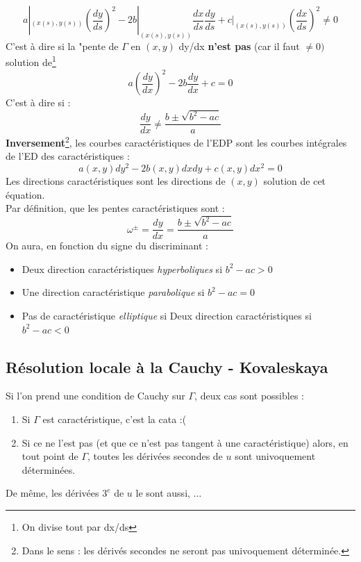 \documentclass[11pt, a4paper, openany]{book}
\begin{document}
			\begin{equation}
				a|_{(x(s),y(s))} \left(\dfrac{dy}{ds}\right)^2 - 2b|_{(x(s),y(s))} \dfrac{dx}{ds}\dfrac{dy}{ds} + c|_{(x(s),y(s))}\left(\dfrac{dx}{ds}\right)^2 \neq 0
			\end{equation}
			C'est à dire si la "pente de $\Gamma$ en $(x,y)$ dy/dx \textbf{n'est pas} (car il faut $\neq 0)$ solution de\footnote{On divise tout par dx/ds}
			\begin{equation}
				a\left(\dfrac{dy}{dx}\right)^2 - 2b\dfrac{dy}{dx} + c = 0
			\end{equation}
			C'est à dire si :
			\begin{equation}
				\dfrac{dy}{dx} \neq \dfrac{b\pm \sqrt{b^2-ac}}{a}
			\end{equation}
			\textbf{Inversement}\footnote{Dans le sens : les dérivés secondes ne seront pas univoquement déterminée.}, les courbes caractéristiques de l'EDP sont les courbes intégrales de l'ED des caractéristiques :
			\begin{equation}
				a(x,y)dy^2 - 2b(x,y)dxdy + c(x,y)dx^2 = 0
			\end{equation}
			Les directions caractéristiques sont les directions de $(x,y)$ solution de cet équation.\\Par définition, que les pentes caractéristiques sont :
			\begin{equation}
				\omega^\pm = \dfrac{dy}{dx} = \dfrac{b\pm \sqrt{b^2-ac}}{a}
			\end{equation}
			On aura, en fonction du signe du discriminant :
			\begin{itemize}
				\item Deux direction caractéristiques \textit{hyperboliques} si $b^2-ac > 0$
				\item Une direction caractéristique \textit{parabolique} si $b^2-ac = 0$
				\item Pas de caractéristique \textit{elliptique} si Deux direction caractéristiques si $b^2-ac < 0$
			\end{itemize}
																
			\subsection{Résolution locale à la Cauchy - Kovaleskaya}
			Si l'on prend une condition de Cauchy sur $\Gamma$, deux cas sont possibles :
			\begin{enumerate}
				\item Si $\Gamma$ est caractéristique, c'est la cata :(
				\item Si ce ne l'est pas (et que ce n'est pas tangent à une caractéristique) alors, en tout point de $\Gamma$, toutes les dérivées secondes de $u$ sont univoquement déterminées.
			\end{enumerate}
			De même, les dérivées $3^e$ de $u$ le sont aussi, $\dots$\\
																
\end{document}
